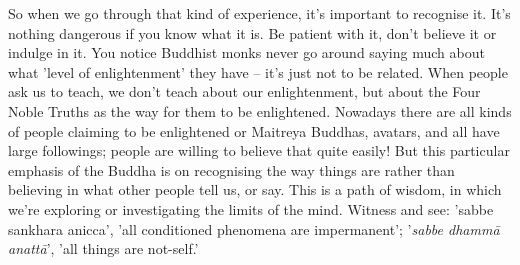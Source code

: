 So when we go through that kind of experience, it's important to recognise it. It's nothing dangerous if you know what it is. Be patient with it, don't believe it or indulge in it. You notice Buddhist monks never go around saying much about what 'level of enlightenment' they have -- it's just not to be related. When people ask us to teach, we don't teach about our enlightenment, but about the Four Noble Truths as the way for them to be enlightened. Nowadays there are all kinds of people claiming to be enlightened or Maitreya Buddhas, avatars, and all have large followings; people are willing to believe that quite easily! But this particular emphasis of the Buddha is on recognising the way things are rather than believing in what other people tell us, or say. This is a path of wisdom, in which we're exploring or investigating the limits of the mind. Witness and see: 'sabbe sankhara anicca', 'all conditioned phenomena are impermanent'; '\textit{sabbe dhamm\=a anatt\=a}', 'all things are not-self.' 


